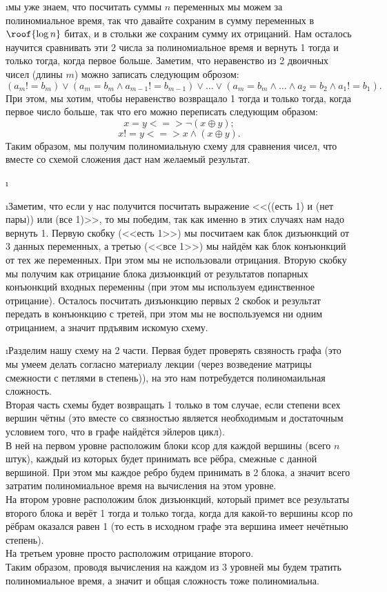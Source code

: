 \i  мы уже знаем, что посчитать суммы $n$ переменных мы можем за полиномиальное время, так что давайте сохраним в сумму переменных в $\roof{\log n}$ битах, и в стольки же сохраним сумму их отрицаний. Нам осталось научится сравнивать эти 2 числа за полиномиальное время и вернуть 1 тогда и только тогда, когда первое больше. Заметим, что неравенство из 2 двоичных чисел (длины $m$) можно записать следующим оброзом:
$$(a_m != b_m) \vee (a_m = b_m \wedge a_{m-1} != b_{m-1}) \vee \ldots \vee (a_m = b_m \wedge \ldots \wedge a_2 = b_2 \wedge a_1 != b_1).$$
При этом, мы хотим, чтобы неравенство возвращало 1 тогда и только тогда, когда первое число больше, так что его можно переписать следующим образом:
$$x = y <=> \neg (x \oplus y);$$
$$x != y <=> x \wedge (x \oplus y).$$
Таким образом, мы получим полиномиальную схему для сравнения чисел, что вместе со схемой сложения даст нам желаемый результат.

\i

\i Заметим, что если у нас получится посчитать выражение <<((есть 1) и (нет пары)) или (все 1)>>, то мы победим, так как именно в этих случаях нам надо вернуть 1. Первую скобку (<<есть 1>>) мы посчитаем как блок дизъюнкций от 3 данных переменных, а третью (<<все 1>>) мы найдём как блок конъюнкций от тех же переменных. При этом мы не использовали отрицания. Вторую скобку мы получим как отрицание блока дизъюнкций от результатов попарных конъюнкций входных переменны (при этом мы используем единственное отрицание). Осталось посчитать дизъюнкцию первых 2 скобок и результат передать в конъюнкцию с третей, при этом мы не воспользуемся ни одним отрицанием, а значит прдъявим искомую схему.

\i Разделим нашу схему на 2 части. Первая будет проверять свзяность графа (это мы умеем делать согласно материалу лекции (через возведение матрицы смежности с петлями в степень)), на это нам потребудется полиномаильная сложность.\\
Вторая часть схемы будет возвращать 1 только в том случае, если степени всех вершин чётны (это вместе со связностью является необходимым и достаточным условием того, что в графе найдётся эйлеров цикл).\\
В ней на первом уровне расположим блоки ксор для каждой вершины (всего $n$ штук), каждый из которых будет принимать все рёбра, смежные с данной вершиной. При этом мы каждое ребро будем принимать в 2 блока, а значит всего затратим полиномиальное время на вычисления на этом уровне.\\
На втором уровне расположим блок дизъюнкций, который примет все результаты второго блока и верёт 1 тогда и только тогда, когда для какой-то вершины ксор по рёбрам оказался равен 1 (то есть в исходном графе эта вершина имеет нечётныю степень).\\
На третьем уровне просто расположим отрицание второго.\\
Таким образом, проводя вычисления на каждом из 3 уровней мы будем тратить полиномиальное время, а значит и общая сложность тоже полиномиальна.

